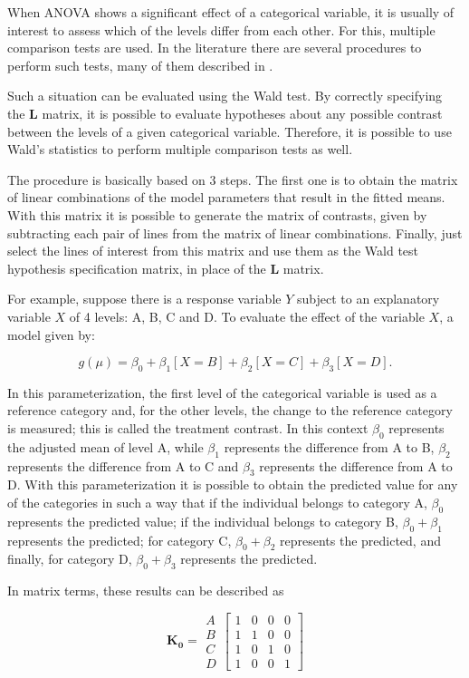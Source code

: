 \documentclass[AMA,STIX1COL]{WileyNJD-v2}
\begin{document}
When ANOVA shows a significant effect of a categorical variable, it is usually of interest to assess which of the levels differ from each other. For this, multiple comparison tests are used. In the literature there are several procedures to perform such tests, many of them described in \cite{hsu1996multiple}.

Such a situation can be evaluated using the Wald test. By correctly specifying the $\boldsymbol{L}$ matrix, it is possible to evaluate hypotheses about any possible contrast between the levels of a given categorical variable. Therefore, it is possible to use Wald's statistics to perform multiple comparison tests as well.

The procedure is basically based on 3 steps. The first one is to obtain the matrix of linear combinations of the model parameters that result in the fitted means. With this matrix it is possible to generate the matrix of contrasts, given by subtracting each pair of lines from the matrix of linear combinations. Finally, just select the lines of interest from this matrix and use them as the Wald test hypothesis specification matrix, in place of the $\boldsymbol{L}$ matrix.
	
For example, suppose there is a response variable $Y$ subject to an explanatory variable $X$ of 4 levels: A, B, C and D. To evaluate the effect of the variable $X$, a model given by:

$$g(\mu) = \beta_0 + \beta_1[X=B] + \beta_2[X=C] + \beta_3[X=D].$$

\noindent In this parameterization, the first level of the categorical variable is used as a reference category and, for the other levels, the change to the reference category is measured; this is called the treatment contrast. In this context $\beta_0$ represents the adjusted mean of level A, while $\beta_1$ represents the difference from A to B, $\beta_2$ represents the difference from A to C and $\beta_3$ represents the difference from A to D. With this parameterization it is possible to obtain the predicted value for any of the categories in such a way that if the individual belongs to category A, $\beta_0$ represents the predicted value; if the individual belongs to category B, $\beta_0 + \beta_1$ represents the predicted; for category C, $\beta_0 + \beta_2$ represents the predicted, and finally, for category D, $\beta_0 + \beta_3$ represents the predicted.

In matrix terms, these results can be described as

$$
    \boldsymbol{K_0} = 
      \begin{matrix}
        A\\ 
        B\\ 
        C\\ 
        D 
      \end{matrix} 
    \begin{bmatrix}
      1 & 0 & 0 & 0\\ 
      1 & 1 & 0 & 0\\ 
      1 & 0 & 1 & 0\\ 
      1 & 0 & 0 & 1 
    \end{bmatrix}
$$
\end{document}
